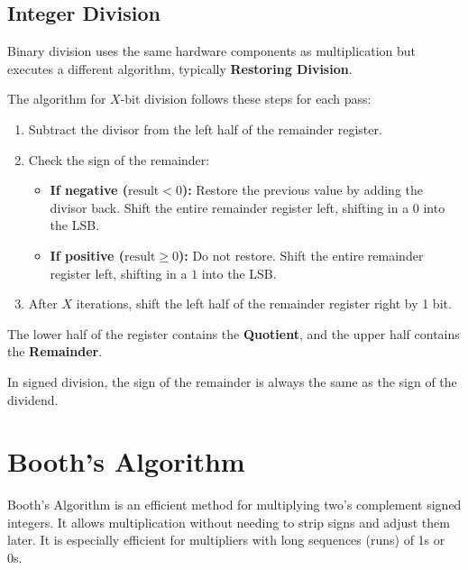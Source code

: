 \subsection{Integer Division}

Binary division uses the same hardware components as multiplication but executes a different algorithm, typically \textbf{Restoring Division}.

\begin{proposition}
The algorithm for $X$-bit division follows these steps for each pass:
\begin{enumerate}
    \item Subtract the divisor from the left half of the remainder register.
    \item Check the sign of the remainder:
    \begin{itemize}
        \item \textbf{If negative ($\text{result} < 0$):} Restore the previous value by adding the divisor back. Shift the entire remainder register left, shifting in a $0$ into the LSB.
        \item \textbf{If positive ($\text{result} \geq 0$):} Do not restore. Shift the entire remainder register left, shifting in a $1$ into the LSB.
    \end{itemize}
    \item After $X$ iterations, shift the left half of the remainder register right by 1 bit.
\end{enumerate}
The lower half of the register contains the \textbf{Quotient}, and the upper half contains the \textbf{Remainder}.
\end{proposition}

\begin{remark}
In signed division, the sign of the remainder is always the same as the sign of the dividend.
\end{remark}

\section{Booth's Algorithm}

\begin{theorem}
Booth's Algorithm is an efficient method for multiplying two's complement signed integers. It allows multiplication without needing to strip signs and adjust them later. It is especially efficient for multipliers with long sequences (runs) of 1s or 0s.
\end{theorem}

